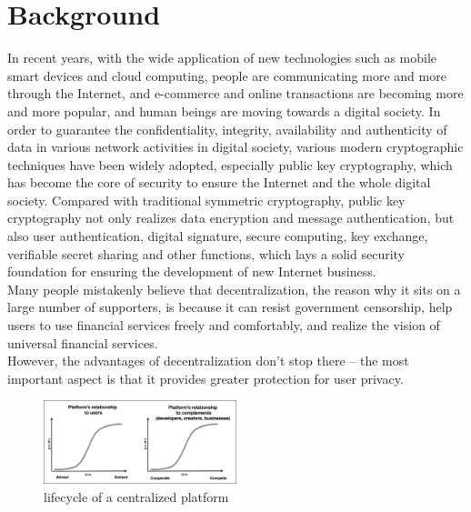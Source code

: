 \section{Background}
In recent years, with the wide application of new technologies such as mobile smart 
devices and cloud computing, people are communicating more and more through the Internet, 
and e-commerce and online transactions are becoming more and more popular, and human 
beings are moving towards a digital society\cite{b2}. In order to guarantee the confidentiality, 
integrity, availability and authenticity of data in various network activities in digital 
society, various modern cryptographic techniques have been widely adopted, especially 
public key cryptography, which has become the core of security to ensure the Internet and 
the whole digital society\cite{b1}. Compared with traditional symmetric cryptography, public key 
cryptography not only realizes data encryption and message authentication, but also user 
authentication, digital signature, secure computing, key exchange, verifiable secret 
sharing and other functions, which lays a solid security foundation for ensuring the 
development of new Internet business\cite{b4}.
\\
Many people mistakenly believe that decentralization, the reason why it sits on a 
large number of supporters, is because it can resist government censorship, help 
users to use financial services freely and comfortably, and realize the vision of 
universal financial services\cite{b3}.
\\
However, the advantages of decentralization don't stop there -- the most important 
aspect is that it provides greater protection for user privacy\cite{b16}.

\begin{figure}[H] %
\centering %
\includegraphics[width=0.5\textwidth]{figures/media.png} %
\caption{lifecycle of a centralized platform} %
\label{Fig.1: lifecycle of a centralized platform} %
\end{figure}

